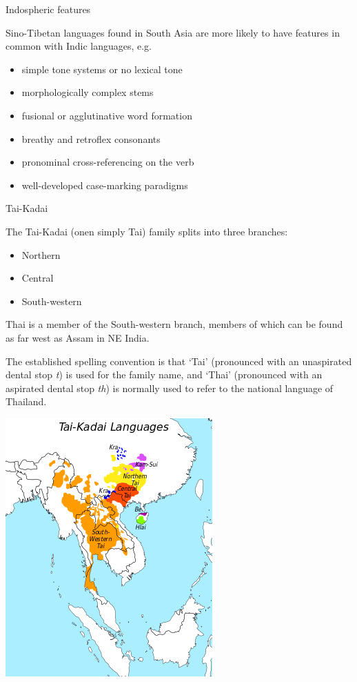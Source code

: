 \documentclass{beamer}
\begin{document}
\begin{frame}{Indospheric features}


Sino-Tibetan languages found in South Asia are more likely to have
features in common with Indic languages, e.g.

\begin{itemize}
\item simple tone systems or no lexical tone
\item morphologically complex stems
\item fusional or agglutinative word formation
\item breathy and retroflex consonants
\item pronominal cross-referencing on the verb
\item well-developed case-marking paradigms
\end{itemize}
\end{frame}

\begin{frame}{Tai-Kadai}

The Tai-Kadai (onen simply Tai) family splits into three branches:
  \begin{itemize}
\item Northern

\item Central

\item South-western
\end{itemize}

Thai is a member of the South-western branch, members of which can be
found as far west as Assam in NE India.

The established spelling convention is that `Tai' (pronounced with an
unaspirated dental stop \emph{t}) is used for the family name, and
`Thai' (pronounced with an aspirated dental stop \emph{th}) is
normally used to refer to the national language of Thailand.

\end{frame}

\begin{frame}
  \begin{center}
  \includegraphics[height=0.9\textheight]{pics/image27.png}
\end{center}
\end{frame}
\end{document}

